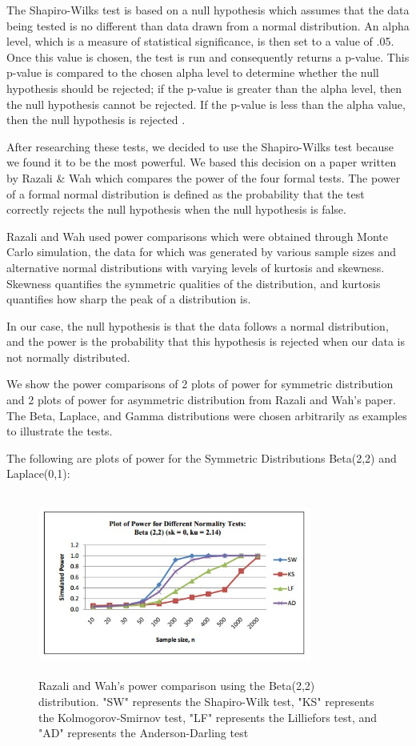 \documentclass[letterpaper,english, 12pt]{article}
\begin{document}
The Shapiro-Wilks test is based on a null hypothesis which assumes that the data being tested is no different than data drawn from a normal distribution. An alpha level, which is a measure of statistical significance, is then set to a value of .05. Once this value is chosen, the test is run and consequently returns a p-value. This p-value is compared to the chosen alpha level to determine whether the null hypothesis should be rejected; if the p-value is greater than the alpha level, then the null hypothesis cannot be rejected. If the p-value is less than the alpha value, then the null hypothesis is rejected \cite{cit2}.


After researching these tests, we decided to use the Shapiro-Wilks test because we found it to be the most powerful. We based this decision on a paper written by Razali \& Wah \cite{cit1} which compares the power of the four formal tests. The power of a formal normal distribution is defined as the probability that the test correctly rejects the null hypothesis when the null hypothesis is false. 

Razali and Wah used power comparisons which were obtained through Monte Carlo simulation, the data for which was generated by various sample sizes and alternative normal distributions with varying levels of kurtosis and skewness.  Skewness quantifies the symmetric qualities of the distribution, and kurtosis quantifies how sharp the peak of a distribution is.

In our case, the null hypothesis is that the data follows a normal distribution, and the power is the probability that this hypothesis is rejected when our data is not normally distributed.  

We show the power comparisons of 2 plots of power for symmetric distribution and 2 plots of power for asymmetric distribution from Razali and Wah's paper. The Beta, Laplace, and Gamma distributions were chosen arbitrarily as examples to illustrate the tests.

The following are plots of power for the Symmetric Distributions Beta(2,2) and Laplace(0,1):

\begin{figure}[t]
	\centering
	\includegraphics[height=6cm,width=90mm]{pics/razali1.jpg}
	\caption{Razali and Wah's power comparison using the Beta(2,2) distribution. "SW" represents the Shapiro-Wilk test, "KS" represents the Kolmogorov-Smirnov test, "LF" represents the Lilliefors test, and "AD" represents the Anderson-Darling test}
\end{figure}
\end{document}
